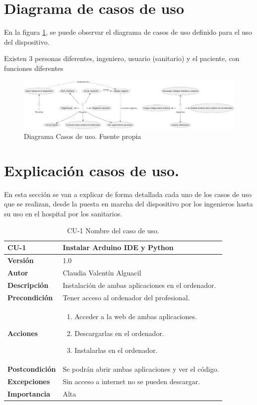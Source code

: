 \section{Diagrama de casos de uso}
En la figura \ref{fig:Diagrama Casos de uso}, se puede observar el diagrama de casos de uso definido para el uso del dispositivo. 

Existen 3 personas diferentes, ingeniero, usuario (sanitario) y el paciente, con funciones diferentes 
\begin{figure}
    \includegraphics[width=1.15\linewidth]{img/Diagrama Casos de Uso.png}
    \caption{Diagrama Casos de uso. Fuente propia}
    \label{fig:Diagrama Casos de uso}
\end{figure}
\section{Explicación casos de uso.}

En esta sección se van a explicar de forma detallada cada uno de los casos de uso que se realizan, desde la puesta en marcha del dispositivo por los ingenieros hasta su uso en el hospital por los sanitarios.

\begin{table}[p]
	\centering
	\begin{tabularx}{\linewidth}{ p{} p{} }
		\toprule
		\textbf{CU-1}    & \textbf{Instalar Arduino IDE y Python}\\
		\toprule
		\textbf{Versión}        & 1.0    \\
		\textbf{Autor}  & Claudia Valentín Alguacil \\
		\textbf{Descripción}          & Instalación de ambas aplicaciones en el ordenador. \\
		\textbf{Precondición}         & Tener acceso al ordenador del profesional. \\
		\textbf{Acciones}             &
		\begin{enumerate}
			\def\labelenumi{\arabic{enumi}.}
			\tightlist
			\item Acceder a la web de ambas aplicaciones.
			\item Descargarlas en el ordenador.
                \item Instalarlas en el ordenador.
		\end{enumerate}\\
		\textbf{Postcondición}        &  Se podrán abrir ambas aplicaciones y ver el código. \\
		\textbf{Excepciones}          & Sin acceso a internet no se pueden descargar. \\
		\textbf{Importancia}          & Alta \\
		\bottomrule
	\end{tabularx}
	\caption{CU-1 Nombre del caso de uso.}
\end{table}

